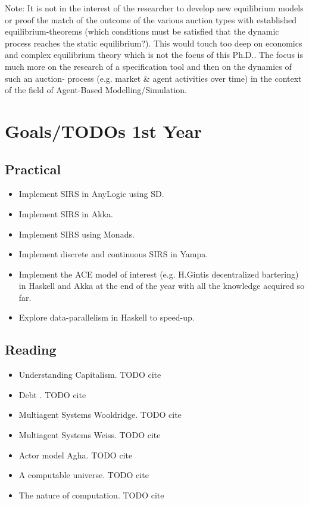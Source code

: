 \documentclass{article}
\begin{document}
{\tiny Note: It is not in the interest of the researcher to develop new equilibrium models or proof the match of the outcome of the various auction types with established equilibrium-theorems (which conditions must be satisfied that the dynamic process reaches the static equilibrium?). This would touch too deep on economics and complex equilibrium theory which is not the focus of this Ph.D.. The focus is much more on the research of a specification tool and then on the dynamics of such an auction- process (e.g. market \& agent activities over time) in the context of the field of Agent-Based Modelling/Simulation.}

\pagebreak

\section{Goals/TODOs 1st Year}
\subsection{Practical}
\begin{itemize}
\item Implement SIRS in AnyLogic using SD.
\item Implement SIRS in Akka.
\item Implement SIRS using Monads.
\item Implement discrete and continuous SIRS in Yampa.
\item Implement the ACE model of interest (e.g. H.Gintis decentralized bartering) in Haskell and Akka at the end of the year with all the knowledge acquired so far.
\item Explore data-parallelism in Haskell to speed-up.
\end{itemize}

\subsection{Reading}
\begin{itemize}
\item Understanding Capitalism. TODO cite
\item Debt . TODO cite
\item Multiagent Systems Wooldridge. TODO cite
\item Multiagent Systems Weiss. TODO cite
\item Actor model Agha. TODO cite
\item A computable universe. TODO cite
\item The nature of computation. TODO cite
\end{itemize}
\end{document}
